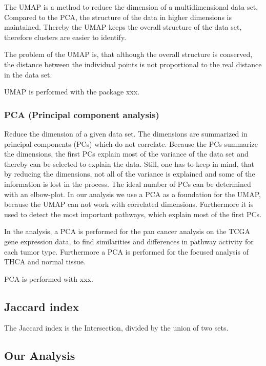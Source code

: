\documentclass[
  parskip,
  oneside]{scrreprt}
\begin{document}
The UMAP is a method to reduce the dimension of a multidimensional data
set. Compared to the PCA, the structure of the data in higher dimensions
is maintained. Thereby the UMAP keeps the overall structure of the data
set, therefore clusters are easier to identify.

The problem of the UMAP is, that although the overall structure is
conserved, the distance between the individual points is not
proportional to the real distance in the data set.

UMAP is performed with the package xxx.

\hypertarget{pca-principal-component-analysis}{%
\subsubsection{PCA (Principal component
analysis)}\label{pca-principal-component-analysis}}

Reduce the dimension of a given data set. The dimensions are summarized
in principal components (PCs) which do not correlate. Because the PCs
summarize the dimensions, the first PCs explain most of the variance of
the data set and thereby can be selected to explain the data. Still, one
has to keep in mind, that by reducing the dimensions, not all of the
variance is explained and some of the information is lost in the
process. The ideal number of PCs can be determined with an elbow-plot.
In our analysis we use a PCA as a foundation for the UMAP, because the
UMAP can not work with correlated dimensions. Furthermore it is used to
detect the most important pathways, which explain most of the first PCs.

In the analysis, a PCA is performed for the pan cancer analysis on the
TCGA gene expression data, to find similarities and differences in
pathway activity for each tumor type. Furthermore a PCA is performed for
the focused analysis of THCA and normal tissue.

PCA is performed with xxx.

\hypertarget{jaccard-index}{%
\subsection{Jaccard index}\label{jaccard-index}}

The Jaccard index is the Intersection, divided by the union of two sets.

\hypertarget{our-analysis}{%
\subsection{Our Analysis}\label{our-analysis}}
\end{document}

